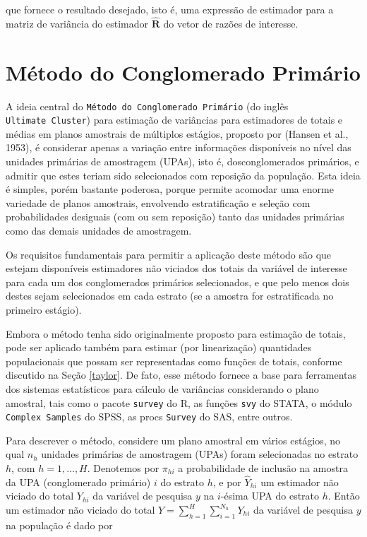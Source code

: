 \documentclass[
  12pt,
  brazilian,
]{book}
\theoremstyle{definition}
\theoremstyle{definition}
\theoremstyle{definition}
\theoremstyle{definition}
\theoremstyle{remark}
\begin{document}
que fornece o resultado desejado, isto é, uma expressão de estimador para a matriz de variância do estimador \(\widehat{\mathbf{R}}\) do vetor de razões de interesse.

\hypertarget{muxe9todo-do-conglomerado-primuxe1rio}{%
\section{Método do Conglomerado Primário}\label{muxe9todo-do-conglomerado-primuxe1rio}}

A ideia central do \texttt{Método\ do\ Conglomerado\ Primário} (do inglês \texttt{Ultimate\ Cluster}) para estimação de variâncias para estimadores de totais e médias em planos amostrais de múltiplos estágios, proposto por (Hansen et al., 1953), é considerar apenas a variação entre informações disponíveis no nível das unidades primárias de amostragem (UPAs), isto é, dosconglomerados primários, e admitir que estes teriam sido selecionados com reposição da população. Esta ideia é simples, porém bastante poderosa, porque permite acomodar uma enorme variedade de planos amostrais, envolvendo estratificação e seleção com probabilidades desiguais (com ou sem reposição) tanto das unidades primárias como das demais unidades de amostragem.

Os requisitos fundamentais para permitir a aplicação deste método são que estejam disponíveis estimadores não viciados dos totais da variável de interesse para cada um dos conglomerados primários selecionados, e que pelo menos dois destes sejam selecionados em cada estrato (se a amostra for estratificada no primeiro estágio).

Embora o método tenha sido originalmente proposto para estimação de totais, pode ser aplicado também para estimar (por linearização) quantidades populacionais que possam ser representadas como funções de totais, conforme discutido na Seção \ref{taylor}. De fato, esse método fornece a base para ferramentas dos sistemas
estatísticos para cálculo de variâncias considerando o plano amostral, tais como o pacote \texttt{survey} do R, as funções \texttt{svy} do STATA, o módulo \texttt{Complex\ Samples} do SPSS, as procs \texttt{Survey} do SAS, entre outros.

Para descrever o método, considere um plano amostral em vários estágios, no qual \(n_{h}\) unidades primárias de amostragem (UPAs) foram selecionadas no estrato \(h\), com \(h=1, \ldots, H\). Denotemos por \(\pi_{hi}\) a probabilidade de inclusão na amostra da UPA (conglomerado primário) \(i\) do estrato \(h\), e por \(\widehat{Y}_{hi}\) um estimador não viciado do total \(Y_{hi}\) da variável de pesquisa \(y\) na \(i\)-ésima UPA do estrato \(h\). Então um estimador não viciado do total \(Y= \sum_{h=1}^{H} \sum_{i=1}^{N_{h}} Y_{hi}\) da variável de pesquisa \(y\) na população é dado por
\end{document}
